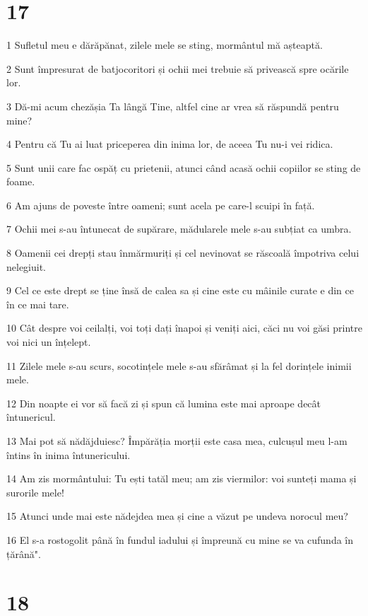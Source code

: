 \chapter{17}

\par 1 Sufletul meu e dărăpănat, zilele mele se sting, mormântul mă așteaptă.
\par 2 Sunt împresurat de batjocoritori și ochii mei trebuie să privească spre ocările lor.
\par 3 Dă-mi acum chezășia Ta lângă Tine, altfel cine ar vrea să răspundă pentru mine?
\par 4 Pentru că Tu ai luat priceperea din inima lor, de aceea Tu nu-i vei ridica.
\par 5 Sunt unii care fac ospăț cu prietenii, atunci când acasă ochii copiilor se sting de foame.
\par 6 Am ajuns de poveste între oameni; sunt acela pe care-l scuipi în față.
\par 7 Ochii mei s-au întunecat de supărare, mădularele mele s-au subțiat ca umbra.
\par 8 Oamenii cei drepți stau înmărmuriți și cel nevinovat se răscoală împotriva celui nelegiuit.
\par 9 Cel ce este drept se ține însă de calea sa și cine este cu mâinile curate e din ce în ce mai tare.
\par 10 Cât despre voi ceilalți, voi toți dați înapoi și veniți aici, căci nu voi găsi printre voi nici un înțelept.
\par 11 Zilele mele s-au scurs, socotințele mele s-au sfărâmat și la fel dorințele inimii mele.
\par 12 Din noapte ei vor să facă zi și spun că lumina este mai aproape decât întunericul.
\par 13 Mai pot să nădăjduiesc? Împărăția morții este casa mea, culcușul meu l-am întins în inima întunericului.
\par 14 Am zis mormântului: Tu ești tatăl meu; am zis viermilor: voi sunteți mama și surorile mele!
\par 15 Atunci unde mai este nădejdea mea și cine a văzut pe undeva norocul meu?
\par 16 El s-a rostogolit până în fundul iadului și împreună cu mine se va cufunda în țărână".

\chapter{18}

